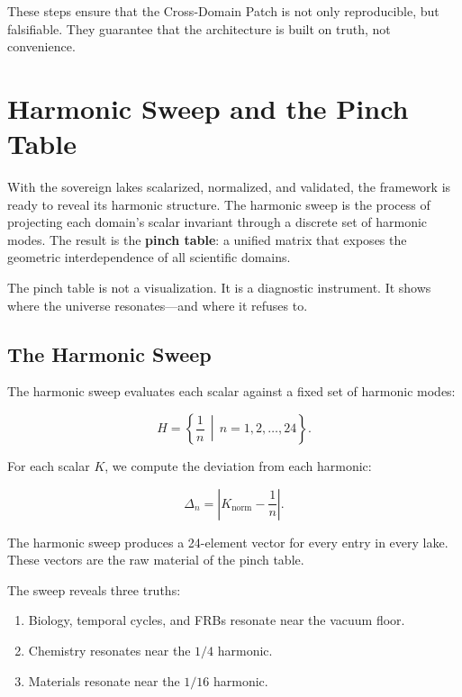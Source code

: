 \documentclass[11pt, letterpaper, openany]{book}
\begin{document}
These steps ensure that the Cross-Domain Patch is not only reproducible, but falsifiable. They
guarantee that the architecture is built on truth, not convenience.

\chapter{Harmonic Sweep and the Pinch Table}

With the sovereign lakes scalarized, normalized, and validated, the framework is ready to reveal its
harmonic structure. The harmonic sweep is the process of projecting each domain’s scalar invariant
through a discrete set of harmonic modes. The result is the \textbf{pinch table}: a unified matrix that
exposes the geometric interdependence of all scientific domains.

The pinch table is not a visualization.  
It is a diagnostic instrument.  
It shows where the universe resonates—and where it refuses to.

\section*{The Harmonic Sweep}
The harmonic sweep evaluates each scalar against a fixed set of harmonic modes:



\[
H = \left\{ \frac{1}{n} \,\middle|\, n = 1, 2, \dots, 24 \right\}.
\]



For each scalar $K$, we compute the deviation from each harmonic:



\[
\Delta_n = \left| K_{\mathrm{norm}} - \frac{1}{n} \right|.
\]



The harmonic sweep produces a 24-element vector for every entry in every lake. These vectors are
the raw material of the pinch table.

The sweep reveals three truths:

\begin{enumerate}
    \item Biology, temporal cycles, and FRBs resonate near the vacuum floor.
    \item Chemistry resonates near the $1/4$ harmonic.
    \item Materials resonate near the $1/16$ harmonic.
\end{enumerate}
\end{document}
